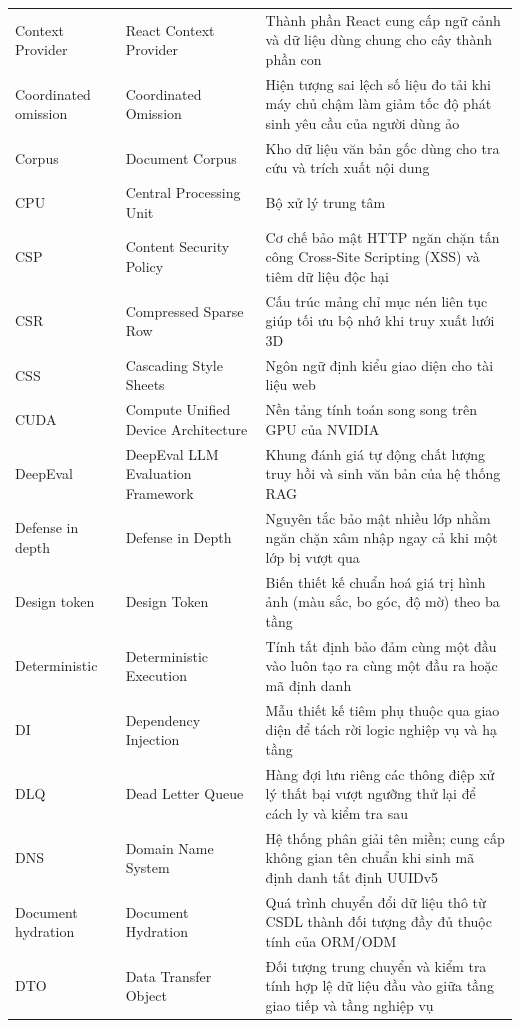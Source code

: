 {\begin{longtable}{@{}>{\raggedright\arraybackslash}p{3.4cm}>{\raggedright\arraybackslash}p{4.7cm}>{\raggedright\arraybackslash}p{7.15cm}@{}}
    Context Provider & React Context Provider & Thành phần React cung cấp ngữ cảnh và dữ liệu dùng chung cho cây thành phần con \\
    Coordinated omission & Coordinated Omission & Hiện tượng sai lệch số liệu đo tải khi máy chủ chậm làm giảm tốc độ phát sinh yêu cầu của người dùng ảo \\
    Corpus & Document Corpus & Kho dữ liệu văn bản gốc dùng cho tra cứu và trích xuất nội dung \\
    CPU & Central Processing Unit & Bộ xử lý trung tâm \\
    CSP & Content Security Policy & Cơ chế bảo mật HTTP ngăn chặn tấn công Cross-Site Scripting (XSS) và tiêm dữ liệu độc hại \\
    CSR & Compressed Sparse Row & Cấu trúc mảng chỉ mục nén liên tục giúp tối ưu bộ nhớ khi truy xuất lưới 3D \\
    CSS & Cascading Style Sheets & Ngôn ngữ định kiểu giao diện cho tài liệu web \\
    CUDA & Compute Unified Device Architecture & Nền tảng tính toán song song trên GPU của NVIDIA \\
    DeepEval & DeepEval LLM Evaluation Framework & Khung đánh giá tự động chất lượng truy hồi và sinh văn bản của hệ thống RAG \\
    Defense in depth & Defense in Depth & Nguyên tắc bảo mật nhiều lớp nhằm ngăn chặn xâm nhập ngay cả khi một lớp bị vượt qua \\
    Design token & Design Token & Biến thiết kế chuẩn hoá giá trị hình ảnh (màu sắc, bo góc, độ mờ) theo ba tầng \\
    Deterministic & Deterministic Execution & Tính tất định bảo đảm cùng một đầu vào luôn tạo ra cùng một đầu ra hoặc mã định danh \\
    DI & Dependency Injection & Mẫu thiết kế tiêm phụ thuộc qua giao diện để tách rời logic nghiệp vụ và hạ tầng \\
    DLQ & Dead Letter Queue & Hàng đợi lưu riêng các thông điệp xử lý thất bại vượt ngưỡng thử lại để cách ly và kiểm tra sau \\
    DNS & Domain Name System & Hệ thống phân giải tên miền; cung cấp không gian tên chuẩn khi sinh mã định danh tất định UUIDv5 \\
    Document hydration & Document Hydration & Quá trình chuyển đổi dữ liệu thô từ CSDL thành đối tượng đầy đủ thuộc tính của ORM/ODM \\
    DTO & Data Transfer Object & Đối tượng trung chuyển và kiểm tra tính hợp lệ dữ liệu đầu vào giữa tầng giao tiếp và tầng nghiệp vụ \\

\end{longtable}}
